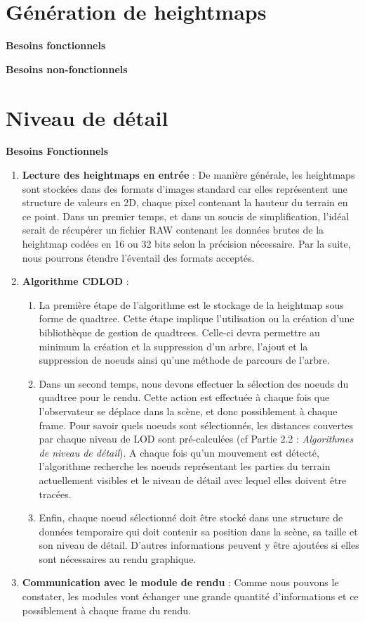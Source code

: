 \documentclass[12pt]{report}
\begin{document}
\section{Génération de heightmaps}

\textbf{Besoins fonctionnels}

\textbf{Besoins non-fonctionnels}

\newpage

\section{Niveau de détail}

\textbf{Besoins Fonctionnels}

\begin{enumerate}
    \item \textbf{Lecture des heightmaps en entrée} : De manière générale, les heightmaps sont stockées dans des formats d'images standard car elles représentent une structure de valeurs en 2D, chaque pixel contenant la hauteur du terrain en ce point. Dans un premier temps, et dans un soucis de simplification, l'idéal serait de récupérer un fichier RAW contenant les données brutes de la heightmap codées en 16 ou 32 bits selon la précision nécessaire. Par la suite, nous pourrons étendre l'éventail des formats acceptés.
    
    \item \textbf{Algorithme CDLOD} :
    \begin{enumerate}
        \item La première étape de l'algorithme est le stockage de la heightmap sous forme de quadtree. Cette étape implique l'utilisation ou la création d'une bibliothèque de gestion de quadtrees. Celle-ci devra permettre au minimum la création et la suppression d'un arbre, l'ajout et la suppression de noeuds ainsi qu'une méthode de parcours de l'arbre.
        \item Dans un second temps, nous devons effectuer la sélection des noeuds du quadtree pour le rendu. Cette action est effectuée à chaque fois que l'observateur se déplace dans la scène, et donc possiblement à chaque frame. Pour savoir quels noeuds sont sélectionnés, les distances couvertes par chaque niveau de LOD sont pré-calculées (cf Partie 2.2 : \textit{Algorithmes de niveau de détail}). A chaque fois qu'un mouvement est détecté, l'algorithme recherche les noeuds représentant les parties du terrain actuellement visibles et le niveau de détail avec lequel elles doivent être tracées.
        \item Enfin, chaque noeud sélectionné doit être stocké dans une structure de données temporaire qui doit contenir sa position dans la scène, sa taille et son niveau de détail. D'autres informations peuvent y être ajoutées si elles sont nécessaires au rendu graphique.
    \end{enumerate}
    
    \item \textbf{Communication avec le module de rendu} : Comme nous pouvons le constater, les modules vont échanger une grande quantité d'informations et ce possiblement à chaque frame du rendu. 
\end{enumerate}
\end{document}
